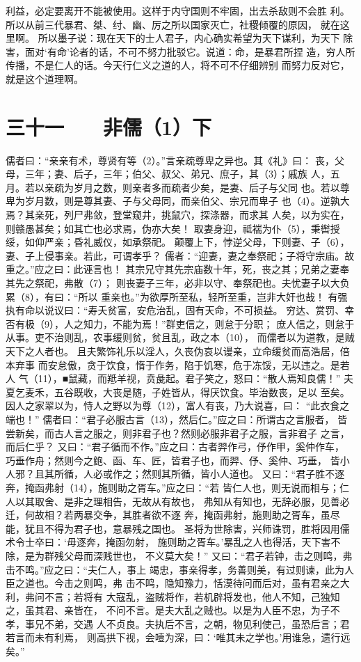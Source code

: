 \documentclass[12pt,UTF8]{ctexbook}
\begin{document}
利益，必定要离开不能被使用。这样于内守国则不牢固，出去杀敌则不会胜 
利。所以从前三代暴君、桀、纣、幽、厉之所以国家灭亡，社稷倾覆的原因， 
就在这里啊。 
所以墨子说：现在天下的士人君子，内心确实希望为天下谋利，为天下 
除害，面对‘有命’论者的话，不可不努力批驳它。说道：命，是暴君所捏 
造，穷人所传播，不是仁人的话。今天行仁义之道的人，将不可不仔细辨别 
而努力反对它，就是这个道理啊。 


\chapter{三十一　　非儒（1）下}

儒者曰：“亲亲有术，尊贤有等（2）。”言亲疏尊卑之异也。其《礼》曰： 
丧，父母，三年；妻、后子，三年；伯父、叔父、弟兄、庶子，其（3）；戚族 
人，五月。若以亲疏为岁月之数，则亲者多而疏者少矣，是妻、后子与父同 
也。若以尊卑为岁月数，则是尊其妻、子与父母同，而亲伯父、宗兄而卑子 
也（4）。逆孰大焉？其亲死，列尸弗敛，登堂窥井，挑鼠穴，探涤器，而求其 
人矣，以为实在，则赣愚甚矣；如其亡也必求焉，伪亦大矣！ 
取妻身迎，祗褍为仆（5），秉辔授绥，如仰严亲；昏礼威仪，如承祭祀。 
颠覆上下，悖逆父母，下则妻、子（6），妻、子上侵事亲。若此，可谓孝乎？ 
儒者：“迎妻，妻之奉祭祀；子将守宗庙。故重之。”应之曰：此诬言也！ 
其宗兄守其先宗庙数十年，死，丧之其；兄弟之妻奉其先之祭祀，弗散（7）； 
则丧妻子三年，必非以守、奉祭祀也。夫忧妻子以大负累（8），有曰：“所以 
重亲也。”为欲厚所至私，轻所至重，岂非大奸也哉！ 
有强执有命以说议曰：“寿夭贫富，安危治乱，固有天命，不可损益。 
穷达、赏罚、幸否有极（9），人之知力，不能为焉！”群吏信之，则怠于分职； 
庶人信之，则怠于从事。吏不治则乱，农事缓则贫，贫且乱，政之本（10）， 
而儒者以为道教，是贼天下之人者也。 
且夫繁饰礼乐以淫人，久丧伪哀以谩亲，立命缓贫而高浩居，倍本弃事 
而安怠傲，贪于饮食，惰于作务，陷于饥寒，危于冻馁，无以违之。是若人 
气（11），■鼠藏，而羝羊视，贲彘起。君子笑之，怒曰：“散人焉知良儒！” 
夫夏乞麦禾，五谷既收，大丧是随，子姓皆从，得厌饮食。毕治数丧，足以 
至矣。因人之家翠以为，恃人之野以为尊（12），富人有丧，乃大说喜，曰： 
“此衣食之端也！” 
儒者曰：“君子必服古言（13），然后仁。”应之曰：所谓古之言服者， 
皆尝新矣，而古人言之服之，则非君子也？然则必服非君子之服，言非君子 
之言，而后仁乎？ 
又曰：“君子循而不作。”应之曰：古者羿作弓，伃作甲，奚仲作车， 
巧垂作舟；然则今之鲍、函、车、匠，皆君子也，而羿、伃、奚仲、巧垂， 
皆小人邪？且其所循，人必或作之；然则其所循，皆小人道也。 
又曰：“君子胜不逐奔，掩函弗射（14），施则助之胥车。”应之曰：“若 
皆仁人也，则无说而相与；仁人以其取舍、是非之理相告，无故从有故也， 
弗知从有知也，无辞必服，见善必迁，何故相？若两暴交争，其胜者欲不逐 
奔，掩函弗射，施则助之胥车，虽尽能，犹且不得为君子也，意暴残之国也。 
圣将为世除害，兴师诛罚，胜将因用儒术令士卒曰：‘毋逐奔，掩函勿射， 
施则助之胥车。’暴乱之人也得活，天下害不除，是为群残父母而深贱世也， 
不义莫大矣！” 
又曰：“君子若钟，击之则鸣，弗击不鸣。”应之曰：“夫仁人，事上 
竭忠，事亲得孝，务善则美，有过则谏，此为人臣之道也。今击之则鸣，弗 
击不鸣，隐知豫力，恬漠待问而后对，虽有君亲之大利，弗问不言；若将有 
大寇乱，盗贼将作，若机辟将发也，他人不知，己独知之，虽其君、亲皆在， 
不问不言。是夫大乱之贼也。以是为人臣不忠，为子不孝，事兄不弟，交遇 
人不贞良。夫执后不言，之朝，物见利使己，虽恐后言；君若言而未有利焉， 
则高拱下视，会噎为深，曰：‘唯其未之学也。’用谁急，遗行远矣。” 
\end{document}
